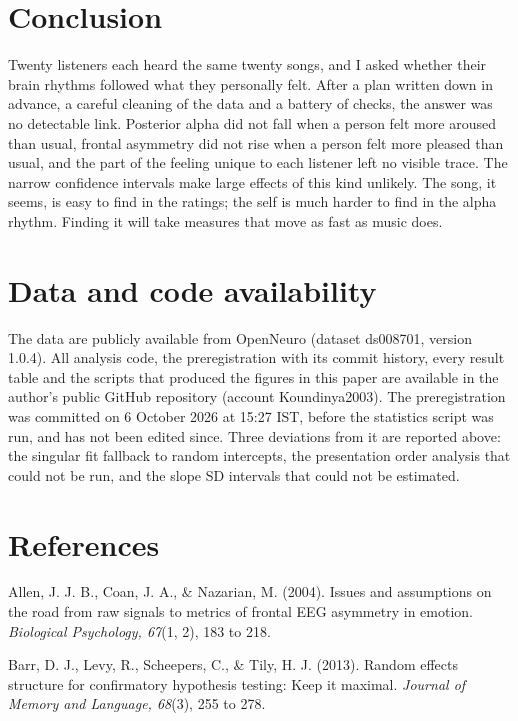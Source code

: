 \documentclass[11pt,a4paper]{article}
\begin{document}
\section{Conclusion}

Twenty listeners each heard the same twenty songs, and I asked whether their brain rhythms followed what they personally felt. After a plan written down in advance, a careful cleaning of the data and a battery of checks, the answer was no detectable link. Posterior alpha did not fall when a person felt more aroused than usual, frontal asymmetry did not rise when a person felt more pleased than usual, and the part of the feeling unique to each listener left no visible trace. The narrow confidence intervals make large effects of this kind unlikely. The song, it seems, is easy to find in the ratings; the self is much harder to find in the alpha rhythm. Finding it will take measures that move as fast as music does.

\section*{Data and code availability}

The data are publicly available from OpenNeuro (dataset ds008701, version 1.0.4). All analysis code, the preregistration with its commit history, every result table and the scripts that produced the figures in this paper are available in the author's public GitHub repository (account Koundinya2003). The preregistration was committed on 6 October 2026 at 15:27 IST, before the statistics script was run, and has not been edited since. Three deviations from it are reported above: the singular fit fallback to random intercepts, the presentation order analysis that could not be run, and the slope SD intervals that could not be estimated.

\section*{References}
\small
\setlength{\parindent}{0pt}
\setlength{\parskip}{0.3em}

Allen, J. J. B., Coan, J. A., \& Nazarian, M. (2004). Issues and assumptions on the road from raw signals to metrics of frontal EEG asymmetry in emotion. \emph{Biological Psychology, 67}(1, 2), 183 to 218.

Barr, D. J., Levy, R., Scheepers, C., \& Tily, H. J. (2013). Random effects structure for confirmatory hypothesis testing: Keep it maximal. \emph{Journal of Memory and Language, 68}(3), 255 to 278.
\end{document}
